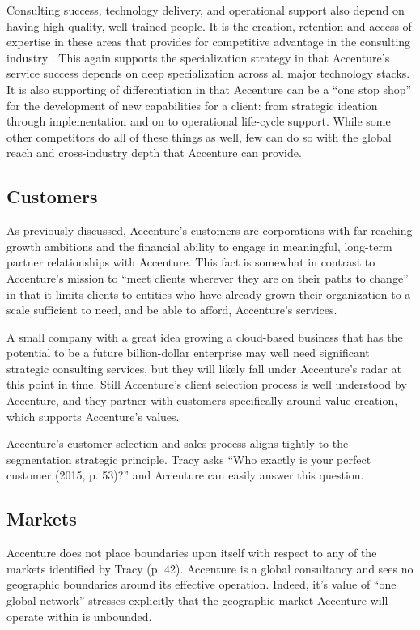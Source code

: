 Consulting success, technology delivery, and operational support also depend on having high quality, well trained people. It is the creation, retention and access of expertise in these areas that provides for competitive advantage in the consulting industry \parencite{sarvaryKnowledgeManagementCompetition1999}. This again supports the specialization strategy in that Accenture's service success depends on deep specialization across all major technology stacks. It is also supporting of differentiation in that Accenture can be a ``one stop shop'' for the development of new capabilities for a client: from strategic ideation through implementation and on to operational life-cycle support. While some other competitors do all of these things as well, few can do so with the global reach and cross-industry depth that Accenture can provide.

\subsection{Customers}

As previously discussed, Accenture's customers are corporations with far reaching growth ambitions and the financial ability to engage in meaningful, long-term partner relationships with Accenture. This fact is somewhat in contrast to Accenture's mission to ``meet clients wherever they are on their paths to change'' in that it limits clients to entities who have already grown their organization to a scale sufficient to need, and be able to afford, Accenture's services.

A small company with a great idea growing a cloud-based business that has the potential to be a future billion-dollar enterprise may well need significant strategic consulting services, but they will likely fall under Accenture's radar at this point in time. Still Accenture's client selection process is well understood by Accenture, and they partner with customers specifically around value creation, which supports Accenture's values.

Accenture's customer selection and sales process aligns tightly to the segmentation strategic principle. Tracy asks ``Who exactly is your perfect customer (2015, p. 53)?'' and Accenture can easily answer this question.

\subsection{Markets}

Accenture does not place boundaries upon itself with respect to any of the markets identified by Tracy (p. 42). Accenture is a global consultancy and sees no geographic boundaries around its effective operation. Indeed, it's value of ``one global network'' stresses explicitly that the geographic market Accenture will operate within is unbounded.

